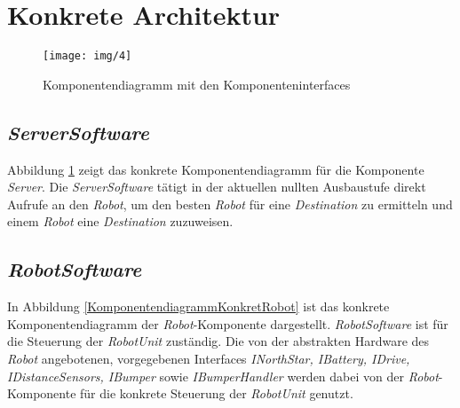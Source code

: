 \section{Konkrete Architektur}

\begin{figure}[H]
\centering
\texttt{[image: img/4]}
\caption{Komponentendiagramm mit den Komponenteninterfaces}
\label{KomponentendiagrammKonkretServer}
\end{figure}

\subsection{\textit{ServerSoftware}}

Abbildung \ref{KomponentendiagrammKonkretServer} zeigt das konkrete Komponentendiagramm für die Komponente \emph{Server}. Die \emph{ServerSoftware} tätigt in der aktuellen nullten Ausbaustufe direkt Aufrufe an den \textit{Robot},
um den besten \textit{Robot} für eine \textit{Destination} zu ermitteln und einem \textit{Robot} eine \textit{Destination} zuzuweisen.

\subsection{\textit{RobotSoftware}}

In Abbildung \ref{KomponentendiagrammKonkretRobot} ist das konkrete Komponentendiagramm der \emph{Robot}-Komponente dargestellt. \emph{RobotSoftware} ist für die Steuerung der \textit{RobotUnit} zuständig. Die von der abstrakten Hardware
des \textit{Robot} angebotenen, vorgegebenen Interfaces \textit{INorthStar, IBattery, IDrive, IDistanceSensors, IBumper} sowie
\textit{IBumperHandler} werden dabei von der \textit{Robot}-Komponente für die konkrete Steuerung der \textit{RobotUnit} genutzt.
